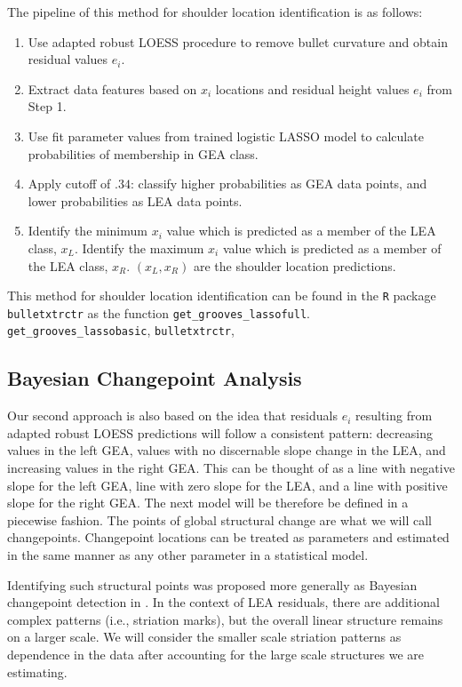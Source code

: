 \documentclass[12pt]{article}
\begin{document}
The pipeline of this method for shoulder location identification is as
follows:

\begin{enumerate}
\item Use adapted robust LOESS procedure to remove bullet curvature and obtain residual values $e_i$.
\item Extract data features based on $x_i$ locations and residual height values $e_i$ from Step 1. 
\item Use fit parameter values from trained logistic LASSO model to calculate probabilities of membership in GEA class. 
\item Apply cutoff of $.34$: classify higher probabilities as GEA data points, and lower probabilities as LEA data points.
\item Identify the minimum $x_i$ value which is predicted as a member of the LEA class, $x_{L}$. Identify the maximum $x_i$ value which is predicted as a member of the LEA class, $x_{R}$. $(x_L, x_R)$ are the shoulder location predictions.  
\end{enumerate}

This method for shoulder location identification can be found in the
\texttt{R} package \texttt{bulletxtrctr} as the function
\texttt{get\_grooves\_lassofull}. {\color{teal}{Another method,}}
\texttt{get\_grooves\_lassobasic},
{\color{teal}{is also available through}} \texttt{bulletxtrctr},
{\color{teal}{but is slightly less accurate and thus is not laid out here.}}

\subsection{Bayesian Changepoint Analysis}

Our second approach is also based on the idea that residuals \(e_i\)
resulting from adapted robust LOESS predictions will follow a consistent
pattern: decreasing values in the left GEA, values with no discernable
slope change in the LEA, and increasing values in the right GEA. This
can be thought of as a line with negative slope for the left GEA, line
with zero slope for the LEA, and a line with positive slope for the
right GEA. The next model will be therefore be defined in a piecewise
fashion. The points of global structural change are what we will call
changepoints. Changepoint locations can be treated as parameters and
estimated in the same manner as any other parameter in a statistical
model.

Identifying such structural points was proposed more generally as
Bayesian changepoint detection in \citet{stephens1994}. In the context
of LEA residuals, there are additional complex patterns (i.e., striation
marks), but the overall linear structure remains on a larger scale. We
will consider the smaller scale striation patterns as dependence in the
data after accounting for the large scale structures we are estimating.
\end{document}
